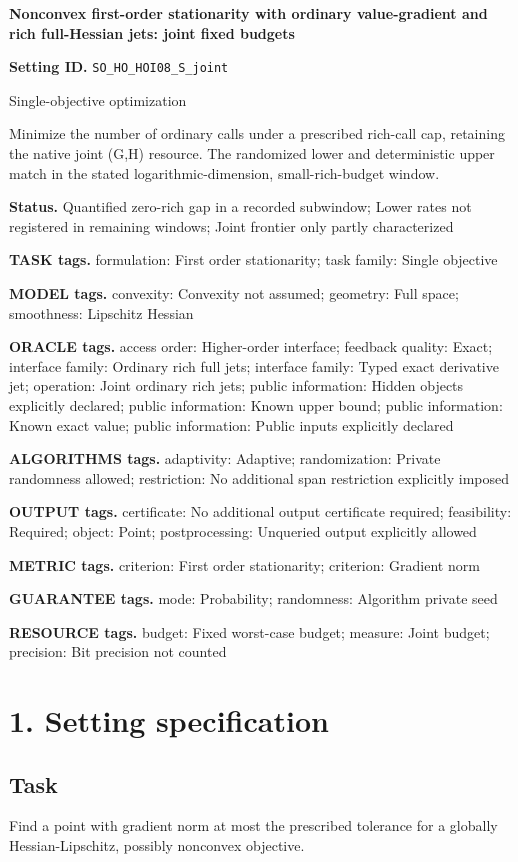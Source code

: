 \documentclass[10pt,a4paper]{article}
\begin{document}
\raggedright

{\LARGE\bfseries\sffamily\color{AtlasNavy} Nonconvex first-order stationarity with ordinary value-gradient and rich full-Hessian jets: joint fixed budgets\par}\vspace{5pt}
\textbf{Setting ID.} \texttt{SO\_\allowbreak{}HO\_\allowbreak{}HOI08\_\allowbreak{}S\_\allowbreak{}joint}

Single-objective optimization

Minimize the number of ordinary calls under a prescribed rich-call cap, retaining the native joint (G,H) resource. The randomized lower and deterministic upper match in the stated logarithmic-dimension, small-rich-budget window.

\textbf{Status.} Quantified zero-rich gap in a recorded subwindow; Lower rates not registered in remaining windows; Joint frontier only partly characterized

\textbf{TASK tags.} formulation: First order stationarity; task family: Single objective

\textbf{MODEL tags.} convexity: Convexity not assumed; geometry: Full space; smoothness: Lipschitz Hessian

\textbf{ORACLE tags.} access order: Higher-order interface; feedback quality: Exact; interface family: Ordinary rich full jets; interface family: Typed exact derivative jet; operation: Joint ordinary rich jets; public information: Hidden objects explicitly declared; public information: Known upper bound; public information: Known exact value; public information: Public inputs explicitly declared

\textbf{ALGORITHMS tags.} adaptivity: Adaptive; randomization: Private randomness allowed; restriction: No additional span restriction explicitly imposed

\textbf{OUTPUT tags.} certificate: No additional output certificate required; feasibility: Required; object: Point; postprocessing: Unqueried output explicitly allowed

\textbf{METRIC tags.} criterion: First order stationarity; criterion: Gradient norm

\textbf{GUARANTEE tags.} mode: Probability; randomness: Algorithm private seed

\textbf{RESOURCE tags.} budget: Fixed worst-case budget; measure: Joint budget; precision: Bit precision not counted

\section{1. Setting specification}
\subsection{Task}
Find a point with gradient norm at most the prescribed tolerance for a globally Hessian-Lipschitz, possibly nonconvex objective.
\end{document}
